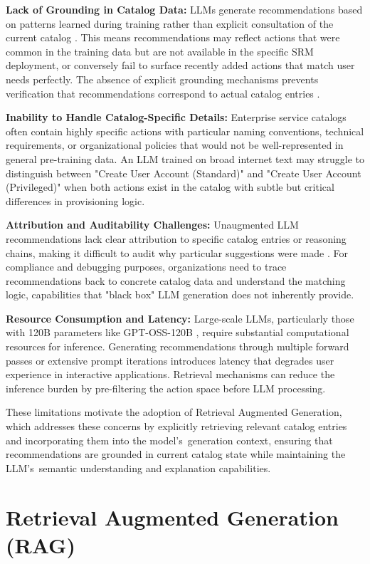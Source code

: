 \textbf{Lack of Grounding in Catalog Data:} LLMs generate recommendations based on patterns learned during training rather than explicit consultation of the current catalog \cite{Ji_2023}. This means recommendations may reflect actions that were common in the training data but are not available in the specific SRM deployment, or conversely fail to surface recently added actions that match user needs perfectly. The absence of explicit grounding mechanisms prevents verification that recommendations correspond to actual catalog entries \cite{Ji_2023}.

\textbf{Inability to Handle Catalog-Specific Details:} Enterprise service catalogs often contain highly specific actions with particular naming conventions, technical requirements, or organizational policies that would not be well-represented in general pre-training data. An LLM trained on broad internet text may struggle to distinguish between "Create User Account (Standard)" and "Create User Account (Privileged)" when both actions exist in the catalog with subtle but critical differences in provisioning logic.

\textbf{Attribution and Auditability Challenges:} Unaugmented LLM recommendations lack clear attribution to specific catalog entries or reasoning chains, making it difficult to audit why particular suggestions were made \cite{Ji_2023}. For compliance and debugging purposes, organizations need to trace recommendations back to concrete catalog data and understand the matching logic, capabilities that "black box" LLM generation does not inherently provide.

\textbf{Resource Consumption and Latency:} Large-scale LLMs, particularly those with 120B parameters like GPT-OSS-120B \cite{mekrache2025ossgpt}, require substantial computational resources for inference. Generating recommendations through multiple forward passes or extensive prompt iterations introduces latency that degrades user experience in interactive applications. Retrieval mechanisms can reduce the inference burden by pre-filtering the action space before LLM processing.

These limitations motivate the adoption of Retrieval Augmented Generation, which addresses these concerns by explicitly retrieving relevant catalog entries and incorporating them into the model's~generation context, ensuring that recommendations are grounded in current catalog state while maintaining the LLM's~semantic understanding and explanation capabilities.

\section{Retrieval Augmented Generation (RAG)}

